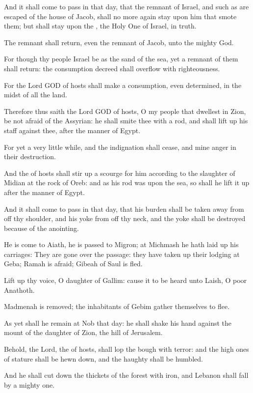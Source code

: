 \Verse And it shall come to pass in that day, that the remnant of Israel, and such as are escaped of the house of Jacob, shall no more again stay upon him that smote them; but shall stay upon the \LORD, the Holy One of Israel, in truth.

\Verse The remnant shall return, even the remnant of Jacob, unto the mighty God.

\Verse For though thy people Israel be as the sand of the sea, yet a remnant of them shall return: the consumption decreed shall overflow with righteousness.

\Verse For the Lord GOD of hosts shall make a consumption, even determined, in the midst of all the land.

\Verse Therefore thus saith the Lord GOD of hosts, O my people that dwellest in Zion, be not afraid of the Assyrian: he shall smite thee with a rod, and shall lift up his staff against thee, after the manner of Egypt.

\Verse For yet a very little while, and the indignation shall cease, and mine anger in their destruction.

\Verse And the \LORD of hosts shall stir up a scourge for him according to the slaughter of Midian at the rock of Oreb: and as his rod was upon the sea, so shall he lift it up after the manner of Egypt.

\Verse And it shall come to pass in that day, that his burden shall be taken away from off thy shoulder, and his yoke from off thy neck, and the yoke shall be destroyed because of the anointing.

\Verse He is come to Aiath, he is passed to Migron; at Michmash he hath laid up his carriages: \Verse They are gone over the passage: they have taken up their lodging at Geba; Ramah is afraid; Gibeah of Saul is fled.

\Verse Lift up thy voice, O daughter of Gallim: cause it to be heard unto Laish, O poor Anathoth.

\Verse Madmenah is removed; the inhabitants of Gebim gather themselves to flee.

\Verse As yet shall he remain at Nob that day: he shall shake his hand against the mount of the daughter of Zion, the hill of Jerusalem.

\Verse Behold, the Lord, the \LORD of hosts, shall lop the bough with terror: and the high ones of stature shall be hewn down, and the haughty shall be humbled.

\Verse And he shall cut down the thickets of the forest with iron, and Lebanon shall fall by a mighty one.


